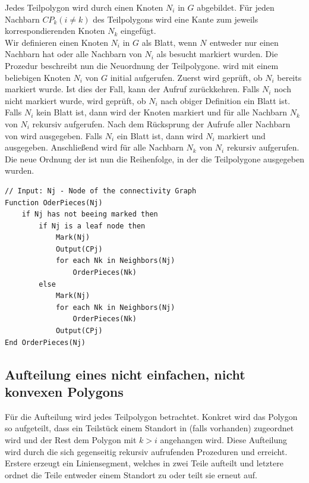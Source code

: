 \documentclass[ngerman]{seminarbeitrag}
\begin{document}
Jedes Teilpolygon \cpi wird durch einen Knoten $N_{i}$ in $G$ abgebildet. Für jeden Nachbarn $CP_{k} (i \ne k)$ des Teilpolygons \cpi wird eine Kante zum jeweils korrespondierenden Knoten $N_{k}$ eingefügt. \\
Wir definieren einen Knoten $N_{i}$ in $G$ als Blatt, wenn $N_{}$ entweder nur einen Nachbarn hat oder alle Nachbarn von $N_{i}$ als besucht markiert wurden.
Die Prozedur \ord beschreibt nun die Neuordnung der Teilpolygone. \ord wird mit einem beliebigen Knoten $N_{i}$ von $G$ initial aufgerufen. Zuerst wird geprüft, ob $N_{i}$ bereits markiert wurde. Ist dies der Fall, kann der Aufruf zurückkehren. Falls $N_{i}$ noch nicht markiert wurde, wird geprüft, ob $N_{i}$ nach obiger Definition ein Blatt ist. Falls $N_{i}$ kein Blatt ist, dann wird der Knoten markiert und für alle Nachbarn $N_{k}$ von $N_{i}$ rekursiv \ord aufgerufen. Nach dem Rücksprung der Aufrufe aller Nachbarn von \cpi wird \cpi ausgegeben. Falls $N_{i}$ ein Blatt ist, dann wird $N_{i}$ markiert und \cpi ausgegeben. Anschließend wird für alle Nachbarn $N_{k}$ von $N_{i}$ rekursiv \ord aufgerufen.
Die neue Ordnung der \cpi ist nun die Reihenfolge, in der die Teilpolygone ausgegeben wurden.

\begin{lstlisting}[float,caption={Der Algorithmus \ord}, frame=single, label=orderpieces]
// Input: Nj - Node of the connectivity Graph
Function OderPieces(Nj)
    if Nj has not beeing marked then
        if Nj is a leaf node then    
            Mark(Nj)
            Output(CPj)
            for each Nk in Neighbors(Nj)
                OrderPieces(Nk)
        else
            Mark(Nj)
            for each Nk in Neighbors(Nj)
                OrderPieces(Nk)
            Output(CPj)
End OrderPieces(Nj)  
\end{lstlisting}

\subsection{Aufteilung eines nicht einfachen, nicht konvexen Polygons}\label{aufteilung nicht konvex}
Für die Aufteilung wird jedes Teilpolygon \cpp betrachtet. Konkret wird das Polygon \pred{\mcpi}so aufgeteilt, dass ein Teilstück einem Standort in \cpi (falls vorhanden) zugeordnet wird und der Rest dem Polygon mit $k > i$ angehangen wird. Diese Aufteilung wird durch die sich gegenseitig rekursiv aufrufenden Prozeduren \noncon und \daa erreicht. Erstere erzeugt ein Liniensegment, welches \pred{\mcpi}in zwei Teile aufteilt und letztere ordnet die Teile entweder einem Standort zu oder teilt sie erneut auf.
\end{document}
